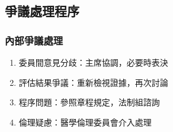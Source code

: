 \documentclass[12pt,a4paper]{article}
\begin{document}
\subsection{爭議處理程序}
\subsubsection{內部爭議處理}
\begin{enumerate}
    \item 委員間意見分歧：主席協調，必要時表決
    \item 評估結果爭議：重新檢視證據，再次討論
    \item 程序問題：參照章程規定，法制組諮詢
    \item 倫理疑慮：醫學倫理委員會介入處理
\end{enumerate}
\end{document}
